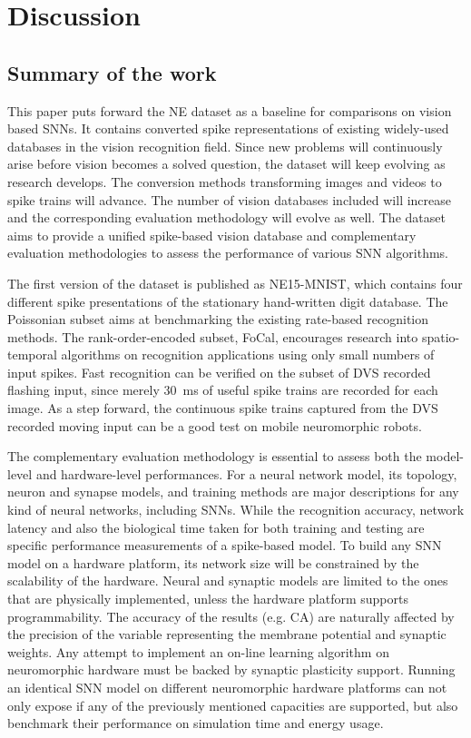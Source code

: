 \documentclass{frontiersENG} %
\begin{document}
\section{Discussion}
\label{sec:summ}
\subsection{Summary of the work}
This paper puts forward the NE dataset as a baseline for comparisons on vision based SNNs.
It contains converted spike representations of existing widely-used databases in the vision recognition field.
Since new problems will continuously arise before vision becomes a solved question, the dataset will keep evolving as research develops. 
The conversion methods transforming images and videos to spike trains will advance. The number of vision databases included will increase and the corresponding evaluation methodology will evolve as well.
The dataset aims to provide a unified spike-based vision database and complementary evaluation methodologies to assess the performance of various SNN algorithms.

The first version of the dataset is published as NE15-MNIST, which contains four different spike presentations of the stationary hand-written digit database.
The Poissonian subset aims at benchmarking the existing rate-based recognition methods.
The rank-order-encoded subset, FoCal, encourages research into spatio-temporal algorithms on recognition applications using only small numbers of input spikes.
Fast recognition can be verified on the subset of DVS recorded flashing input, since merely 30~ms of useful spike trains are recorded for each image.
As a step forward, the continuous spike trains captured from the DVS recorded moving input can be a good test on mobile neuromorphic robots.

The complementary evaluation methodology is essential to assess both the model-level and hardware-level performances.
For a neural network model, its topology, neuron and synapse models, and training methods are major descriptions for any kind of neural networks, including SNNs.
While the recognition accuracy, network latency and also the biological time taken for both training and testing are specific performance measurements of a spike-based model.
To build any SNN model on a hardware platform, its network size will be constrained by the scalability of the hardware. Neural and synaptic models are limited to the ones that are physically implemented, unless the hardware platform supports programmability.
The accuracy of the results (e.g. CA) are naturally affected by the precision of the variable representing the membrane potential and synaptic weights.
Any attempt to implement an on-line learning algorithm on neuromorphic hardware must be backed by synaptic plasticity support.
Running an identical SNN model on different neuromorphic hardware platforms can not only expose if any of the previously mentioned capacities are supported, but also benchmark their performance on simulation time and energy usage.
\end{document}
